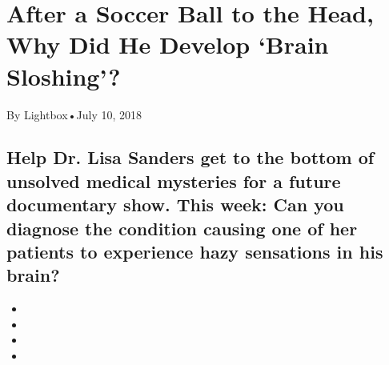 \hypertarget{after-a-soccer-ball-to-the-head-why-did-he-develop-brain-sloshing-1}{%
\section{After a Soccer Ball to the Head, Why Did He Develop `Brain
Sloshing'?}\label{after-a-soccer-ball-to-the-head-why-did-he-develop-brain-sloshing-1}}

By Lightbox•July 10, 2018

\hypertarget{help-dr-lisa-sanders-get-to-the-bottom-of-unsolved-medical-mysteries-for-a-future-documentary-show-this-week-can-you-diagnose-the-condition-causing-one-of-her-patients-to-experience-hazy-sensations-in-his-brain-1}{%
\subsection{Help Dr. Lisa Sanders get to the bottom of unsolved medical
mysteries for a future documentary show. This week: Can you diagnose the
condition causing one of her patients to experience hazy sensations in
his
brain?}\label{help-dr-lisa-sanders-get-to-the-bottom-of-unsolved-medical-mysteries-for-a-future-documentary-show-this-week-can-you-diagnose-the-condition-causing-one-of-her-patients-to-experience-hazy-sensations-in-his-brain-1}}

\begin{itemize}
\item
\item
\item
\item
\end{itemize}

